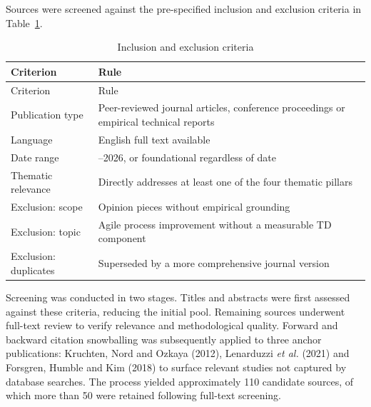 \documentclass[
  12pt,
  letterpaper,
  12pt,
  oneside,
  english,
  onehalfspacing,
  headsepline]{MastersDoctoralThesis}
\begin{document}
Sources were screened against the pre-specified inclusion and exclusion
criteria in Table~\ref{tbl-criteria}.

\begin{longtable}[]{@{}
  >{\raggedright\arraybackslash}p{}
  >{\raggedright\arraybackslash}p{}@{}}
\caption{Inclusion and exclusion
criteria}\label{tbl-criteria}\tabularnewline
\toprule\noalign{}
\begin{minipage}[b]{\linewidth}\raggedright
Criterion
\end{minipage} & \begin{minipage}[b]{\linewidth}\raggedright
Rule
\end{minipage} \\
\midrule\noalign{}
\endfirsthead
\toprule\noalign{}
\begin{minipage}[b]{\linewidth}\raggedright
Criterion
\end{minipage} & \begin{minipage}[b]{\linewidth}\raggedright
Rule
\end{minipage} \\
\midrule\noalign{}
\endhead
\bottomrule\noalign{}
\endlastfoot
Publication type & Peer-reviewed journal articles, conference
proceedings or empirical technical reports \\
Language & English full text available \\
Date range & 2019--2026, or foundational regardless of date \\
Thematic relevance & Directly addresses at least one of the four
thematic pillars \\
Exclusion: scope & Opinion pieces without empirical grounding \\
Exclusion: topic & Agile process improvement without a measurable TD
component \\
Exclusion: duplicates & Superseded by a more comprehensive journal
version \\
\end{longtable}

Screening was conducted in two stages. Titles and abstracts were first
assessed against these criteria, reducing the initial pool. Remaining
sources underwent full-text review to verify relevance and
methodological quality. Forward and backward citation snowballing was
subsequently applied to three anchor publications: Kruchten, Nord and
Ozkaya (2012), Lenarduzzi \emph{et al.} (2021) and Forsgren, Humble and
Kim (2018) to surface relevant studies not captured by database
searches. The process yielded approximately 110 candidate sources, of
which more than 50 were retained following full-text screening.
\end{document}
